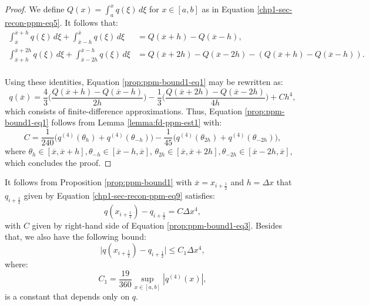 \begin{proof}
	We define $Q(x) = \int_{a}^{x} q(\xi) \,d\xi$ for $x \in [a,b]$ as in 
	Equation \eqref{chp1-sec-recon-ppm-eq5}. It follows that:
	\begin{align*}
		\int_{\overline{x}}^{\overline{x}+h} q(\xi) \,d\xi + \int_{\overline{x}-h}^{\overline{x}} q(\xi) \,d\xi &=
		Q(\overline{x}+h) - Q(\overline{x}-h), \\
		\int_{\overline{x}+h}^{\overline{x}+2h} q(\xi) \,d\xi + \int_{\overline{x}-2h}^{\overline{x}-h} q(\xi) \,d\xi &=
		Q(\overline{x}+2h) - Q(\overline{x}-2h) - (Q(\overline{x}+h) - Q(\overline{x}-h)). \\
	\end{align*}
	
	Using these identities, Equation \eqref{prop:ppm-bound1-eq1} may be rewritten as:
	\begin{equation}
		\label{prop:ppm-bound1-eq2}
		q(\overline{x}) = \frac{4}{3} \bigg(\frac{Q(\overline{x}+h) - Q(\overline{x}-h)}{2h}\bigg)
		       - \frac{1}{3} \bigg(\frac{Q(\overline{x}+2h) - Q(\overline{x}-2h)}{4h}\bigg)
+ Ch^4,
	\end{equation}
	which consists of finite-difference approximations. 
	Thus, Equation \eqref{prop:ppm-bound1-eq1} follows from Lemma \ref{lemma:fd-ppm-est1}
	with:
	\begin{equation}
		\label{prop:ppm-bound1-eq3}
		C = \frac{1}{240}\bigg( q^{(4)}(\theta_{h}) + q^{(4)}(\theta_{-h})\bigg)
		- \frac{1}{45}\bigg( q^{(4)}(\theta_{2h}) + q^{(4)}(\theta_{-2h})\bigg), 
	\end{equation}
	where $\theta_{h} \in [\overline{x},\overline{x}+h], \theta_{-h}\in [\overline{x}-h,\overline{x}]$, 
	$\theta_{2h} \in [\overline{x},\overline{x}+2h], \theta_{-2h}\in [\overline{x}-2h,\overline{x}]$,
	which concludes the proof.

  \renewcommand\qedsymbol{} %
\end{proof}

\begin{corollary}
	\label{prop:ppm-bound1-corollary}
	It follows from Proposition \ref{prop:ppm-bound1} with
	$\overline{x} = x_{i+\frac{1}{2}}$ and $h = \Delta x$
	that $q_{i+\frac{1}{2}}$ given by Equation \eqref{chp1-sec-recon-ppm-eq9} satisfies:
	\begin{equation}
		\label{ppm-edges-bound1}
		q{(x_{i+\frac{1}{2}})} - q_{i+\frac{1}{2}} = C\Delta x^4,
	\end{equation}
	with $C$ given by right-hand side of Equation \eqref{prop:ppm-bound1-eq3}.
	Besides that, we also have the following bound:
	\begin{equation}
		\label{ppm-edges-bound2}
		\big|q{(x_{i+\frac{1}{2}})} - q_{i+\frac{1}{2}}\big| \leq C_1\Delta x^4,
	\end{equation}
	where:
	\begin{equation}
		\label{ppm-cte-bound1}
		C_1 = \frac{19}{360}\sup_{x \in [a,b]}{|q^{(4)}(x)|},
	\end{equation}
	is a constant that depends only on $q$.
\end{corollary}

